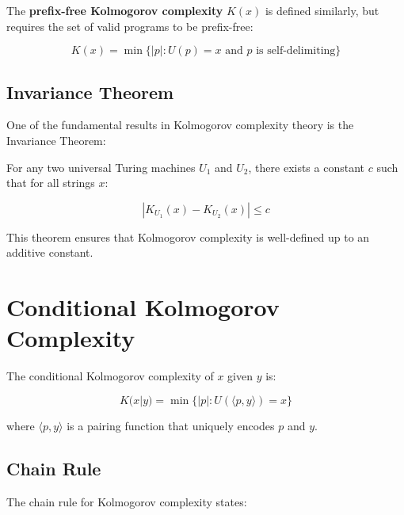 \documentclass[12pt,a4paper]{report}
\begin{document}
\begin{definition}
The \textbf{prefix-free Kolmogorov complexity} $K(x)$ is defined similarly, but requires the set of valid programs to be prefix-free:

\begin{equation}
K(x) = \min\{|p| : U(p) = x \text{ and } p \text{ is self-delimiting}\}
\end{equation}
\end{definition}

\subsection{Invariance Theorem}

One of the fundamental results in Kolmogorov complexity theory is the Invariance Theorem:

\begin{theorem}
For any two universal Turing machines $U_1$ and $U_2$, there exists a constant $c$ such that for all strings $x$:

\begin{equation}
|K_{U_1}(x) - K_{U_2}(x)| \leq c
\end{equation}
\end{theorem}

This theorem ensures that Kolmogorov complexity is well-defined up to an additive constant.

\section{Conditional Kolmogorov Complexity}

\begin{definition}
The conditional Kolmogorov complexity of $x$ given $y$ is:

\begin{equation}
K(x|y) = \min\{|p| : U(\langle p, y \rangle) = x\}
\end{equation}

where $\langle p, y \rangle$ is a pairing function that uniquely encodes $p$ and $y$.
\end{definition}

\subsection{Chain Rule}

The chain rule for Kolmogorov complexity states:
\end{document}
